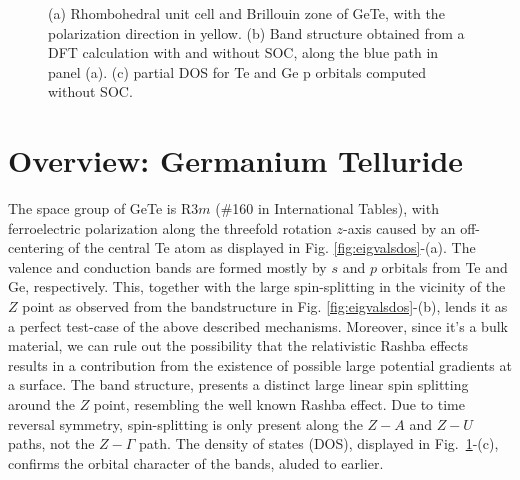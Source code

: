 \begin{figure}[h]
{}
\caption{\label{fig:Rashba_BZBSDOS}(a) Rhombohedral unit cell and Brillouin zone of GeTe, with the polarization direction in yellow. (b) Band structure obtained from a DFT calculation with and without SOC, along the blue path in panel (a). (c) partial DOS for Te and Ge p orbitals computed without SOC.}
\end{figure}
\section{Overview: Germanium Telluride}
The space group of GeTe is R$3m$ (\#160 in International Tables), with ferroelectric polarization along the threefold rotation $z$-axis caused by an off-centering of the central Te atom \cite{Rabe1987} as displayed in Fig. \ref{fig:eigvalsdos}-(a). The valence and conduction bands are formed mostly by $s$ and $p$ orbitals from Te and Ge, respectively. This, together with the large spin-splitting in the vicinity of the $Z$ point \cite{DiSante2013} as observed from the bandstructure in Fig. \ref{fig:eigvalsdos}-(b), lends it as a perfect test-case of the above described mechanisms. Moreover, since it's a bulk material, we can rule out the possibility that the relativistic Rashba effects results in a contribution from the existence of possible large potential gradients at a surface. The band structure,  presents a distinct large linear spin splitting around the $Z$ point, resembling the well known Rashba effect. Due to time reversal symmetry, spin-splitting is only present along the $Z-A$ and $Z-U$ paths, not the $Z-\Gamma$ path.
The density of states (DOS), displayed in Fig.~\ref{fig:Rashba_BZBSDOS}-(c), confirms the orbital character of the bands, aluded to earlier.
